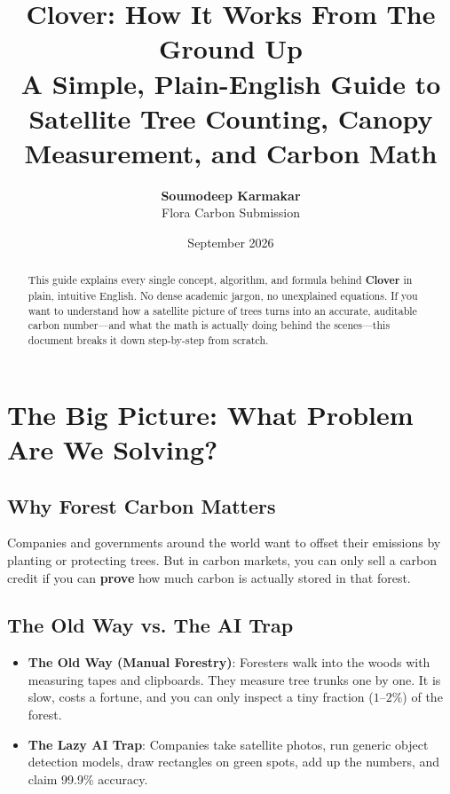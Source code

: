 \documentclass[11pt,a4paper]{article}
\title{\textbf{\LARGE Clover: How It Works From The Ground Up}\\[0.4em]
\large A Simple, Plain-English Guide to Satellite Tree Counting, Canopy Measurement, and Carbon Math}
\author{\textbf{Soumodeep Karmakar} \\ Flora Carbon Submission}
\date{September 2026}
\begin{document}
\maketitle

\begin{abstract}
This guide explains every single concept, algorithm, and formula behind \textbf{Clover} in plain, intuitive English. No dense academic jargon, no unexplained equations. If you want to understand how a satellite picture of trees turns into an accurate, auditable carbon number---and what the math is actually doing behind the scenes---this document breaks it down step-by-step from scratch.
\end{abstract}

\tableofcontents
\newpage

\section{The Big Picture: What Problem Are We Solving?}

\subsection{Why Forest Carbon Matters}
Companies and governments around the world want to offset their emissions by planting or protecting trees. But in carbon markets, you can only sell a carbon credit if you can \textbf{prove} how much carbon is actually stored in that forest.

\subsection{The Old Way vs. The AI Trap}
\begin{itemize}
    \item \textbf{The Old Way (Manual Forestry)}: Foresters walk into the woods with measuring tapes and clipboards. They measure tree trunks one by one. It is slow, costs a fortune, and you can only inspect a tiny fraction ($1\text{--}2\%$) of the forest.
    \item \textbf{The Lazy AI Trap}: Companies take satellite photos, run generic object detection models, draw rectangles on green spots, add up the numbers, and claim 99.9\% accuracy. 
\end{itemize}
\end{document}
